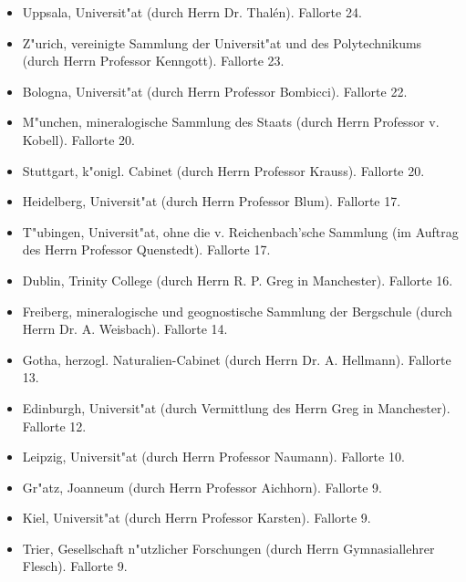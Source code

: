 \documentclass[a4paper, 11pt, oneside]{article}
\begin{document}
\begin{itemize}
    \item Uppsala, Universit"at (durch Herrn Dr. Thalén). Fallorte 24.

    \item Z"urich, vereinigte Sammlung der Universit"at und des Polytechnikums (durch Herrn Professor Kenngott). Fallorte 23.

    \item Bologna, Universit"at (durch Herrn Professor Bombicci). Fallorte 22.

    \item M"unchen, mineralogische Sammlung des Staats (durch Herrn Professor v. Kobell). Fallorte 20.

    \item Stuttgart, k"onigl. Cabinet (durch Herrn Professor Krauss). Fallorte 20.

    \item Heidelberg, Universit"at (durch Herrn Professor Blum). Fallorte 17.

    \item T"ubingen, Universit"at, ohne die v. Reichenbach'sche Sammlung (im Auftrag des Herrn Professor Quenstedt). Fallorte 17.

    \item Dublin, Trinity College (durch Herrn R. P. Greg in Manchester). Fallorte 16.

    \item Freiberg, mineralogische und geognostische Sammlung der Bergschule (durch Herrn Dr. A. Weisbach). Fallorte 14.

    \item Gotha, herzogl. Naturalien-Cabinet (durch Herrn Dr. A. Hellmann). Fallorte 13.

    \item Edinburgh, Universit"at (durch Vermittlung des Herrn Greg in Manchester). Fallorte 12.

    \item Leipzig, Universit"at (durch Herrn Professor Naumann). Fallorte 10.

    \item Gr"atz, Joanneum (durch Herrn Professor Aichhorn). Fallorte 9.

    \item Kiel, Universit"at (durch Herrn Professor Karsten). Fallorte 9.

    \item Trier, Gesellschaft n"utzlicher Forschungen (durch Herrn Gymnasiallehrer Flesch). Fallorte 9.


\end{itemize}
\end{document}
